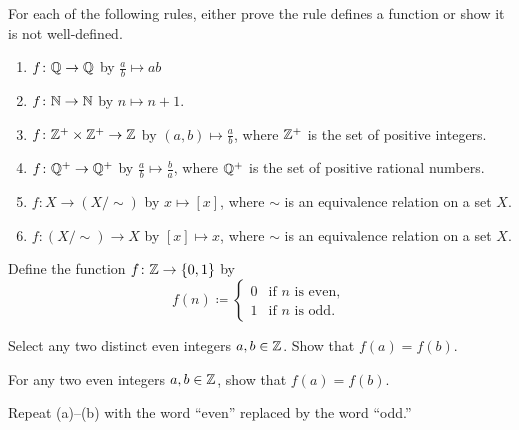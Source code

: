 \documentclass[../notes.tex]{subfiles}
\begin{document}
\begin{homework}
    For each of the following rules, either prove the rule defines a function or show it is not well-defined.
    \begin{enumerate}[label=(\alph*)]
        \item $f\colon \mathbb Q \to \mathbb Q$ by $\frac{a}{b} \mapsto ab$
        \item $f\colon \mathbb N \to \mathbb N$ by $n \mapsto n + 1$.
        \item $f\colon \mathbb Z^+ \times \mathbb Z^+ \to \mathbb Z$ by $(a, b) \mapsto \frac{a}{b}$, where $\mathbb Z^+$ is the set of positive integers.
        \item $f\colon \mathbb Q^+ \to \mathbb Q^+$ by $\frac ab\mapsto\frac ba$, where $\mathbb Q^+$ is the set of positive rational numbers.
        \item $f\colon X \to (X / {\sim})$ by $x \mapsto [x]$, where $\sim$ is an equivalence relation on a set $X$.
        \item $f\colon (X / {\sim}) \to X$ by $[x] \mapsto x$, where $\sim$ is an equivalence relation on a set $X$.
    \end{enumerate}
\end{homework}
\begin{homework}
    Define the function $f\colon\mathbb Z\to\{0,1\}$ by
    \[f(n)\coloneqq\begin{cases}
        0 & \text{if }n\text{ is even}, \\
        1 & \text{if }n\text{ is odd}.
    \end{cases}\]
    \begin{listalph}
        \item Select any two distinct even integers $a,b\in\mathbb Z$. Show that $f(a)=f(b)$.
        \item For any two even integers $a,b\in\mathbb Z$, show that $f(a)=f(b)$.
        \item Repeat (a)--(b) with the word ``even'' replaced by the word ``odd.''
    \end{listalph}
\end{homework}
\end{document}
